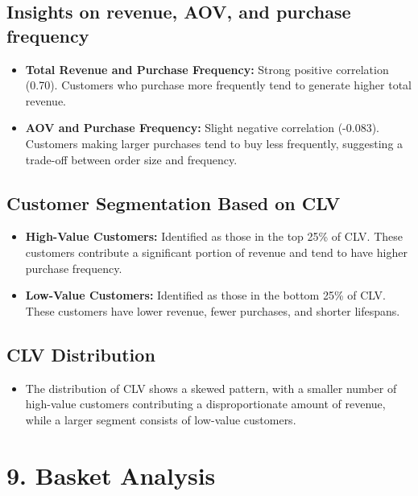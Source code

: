 \documentclass{article}
\begin{document}
    \subsection{Insights on revenue, AOV, and purchase frequency}
    \begin{itemize}
        \item \textbf{Total Revenue and Purchase Frequency:} Strong positive correlation (0.70). Customers who purchase more frequently tend to generate higher total revenue.
        \item \textbf{AOV and Purchase Frequency:} Slight negative correlation (-0.083). Customers making larger purchases tend to buy less frequently, suggesting a trade-off between order size and frequency.
    \end{itemize}
    
    \subsection{Customer Segmentation Based on CLV}
    \begin{itemize}
        \item \textbf{High-Value Customers:} Identified as those in the top 25\% of CLV. These customers contribute a significant portion of revenue and tend to have higher purchase frequency.
        \item \textbf{Low-Value Customers:} Identified as those in the bottom 25\% of CLV. These customers have lower revenue, fewer purchases, and shorter lifespans.
    \end{itemize}
    
    \subsection{CLV Distribution}
    \begin{itemize}
        \item The distribution of CLV shows a skewed pattern, with a smaller number of high-value customers contributing a disproportionate amount of revenue, while a larger segment consists of low-value customers.
    \end{itemize}

\section{9. Basket Analysis}
\end{document}
